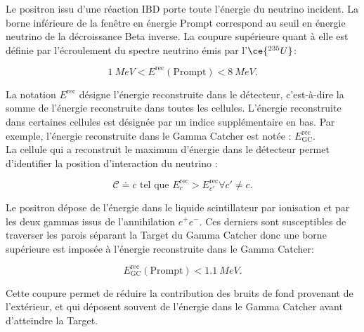Le positron issu d'une réaction IBD porte toute l'énergie du neutrino incident. La borne inférieure de la fenêtre en énergie Prompt correspond au seuil en énergie neutrino de la décroissance Beta inverse. La coupure supérieure quant à elle est définie par l'écroulement du spectre neutrino émis par l'$\ce{^{235}U}$:

\begin{equation}
    \SI{1}{MeV} < E^\textrm{rec}(\textrm{Prompt}) < \SI{8}{MeV}.
\end{equation}

\bigbreak

La notation $E^\textrm{rec}$ désigne l'énergie reconstruite dans le détecteur, c'est-à-dire la somme de l'énergie reconstruite dans toutes les cellules. L'énergie reconstruite dans certaines cellules est désignée par un indice supplémentaire en bas. Par exemple, l'énergie reconstruite dans le Gamma Catcher est notée : $E^\textrm{rec}_\textrm{GC}$.\\

La cellule qui a reconstruit le maximum d'énergie dans le détecteur permet d'identifier la position d'interaction du neutrino :

\begin{equation}
    \mathcal{C} \doteq c \textrm{ tel que } E_c^\textrm{rec} > E_{c'}^\textrm{rec} \forall c' \neq c.
\end{equation}

\bigbreak

Le positron dépose de l'énergie dans le liquide scintillateur par ionisation et par les deux gammas issus de l'annihilation $e^+e^-$. Ces derniers sont susceptibles de traverser les parois séparant la Target du Gamma Catcher donc une borne supérieure est imposée à l'énergie reconstruite dans le Gamma Catcher:

\begin{equation}
    E^\textrm{rec}_\textrm{GC}(\textrm{Prompt}) < \SI{1.1}{MeV}.
\end{equation}

\bigbreak

Cette coupure permet de réduire la contribution des bruits de fond provenant de l'extérieur, et qui déposent souvent de l'énergie dans le Gamma Catcher avant d'atteindre la Target.\\

